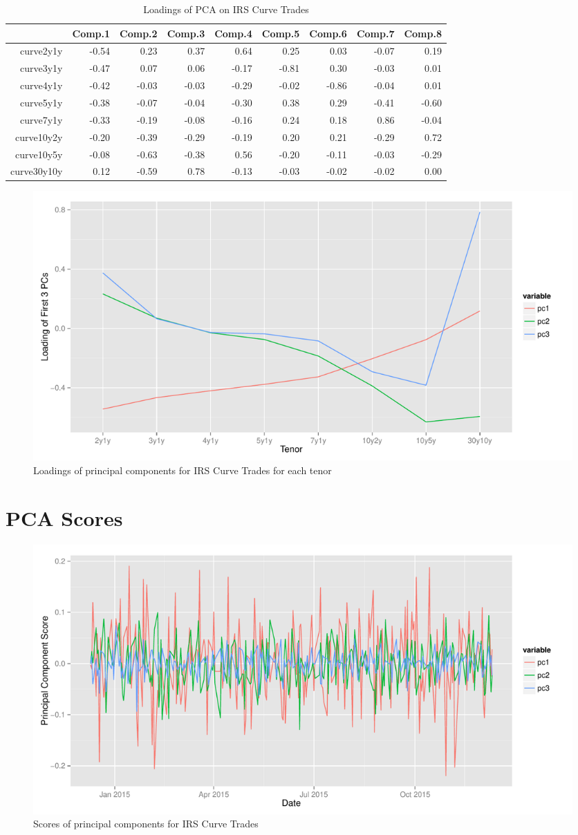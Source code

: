 \begin{table}[ht]
\centering
\begin{tabu}{rrrrrrrrr}
  \toprule
 & Comp.1 & Comp.2 & Comp.3 & Comp.4 & Comp.5 & Comp.6 & Comp.7 & Comp.8 \\ 
  \midrule
curve2y1y & -0.54 & 0.23 & 0.37 & 0.64 & 0.25 & 0.03 & -0.07 & 0.19 \\ 
  curve3y1y & -0.47 & 0.07 & 0.06 & -0.17 & -0.81 & 0.30 & -0.03 & 0.01 \\ 
  curve4y1y & -0.42 & -0.03 & -0.03 & -0.29 & -0.02 & -0.86 & -0.04 & 0.01 \\ 
  curve5y1y & -0.38 & -0.07 & -0.04 & -0.30 & 0.38 & 0.29 & -0.41 & -0.60 \\ 
  curve7y1y & -0.33 & -0.19 & -0.08 & -0.16 & 0.24 & 0.18 & 0.86 & -0.04 \\ 
  curve10y2y & -0.20 & -0.39 & -0.29 & -0.19 & 0.20 & 0.21 & -0.29 & 0.72 \\ 
  curve10y5y & -0.08 & -0.63 & -0.38 & 0.56 & -0.20 & -0.11 & -0.03 & -0.29 \\ 
  curve30y10y & 0.12 & -0.59 & 0.78 & -0.13 & -0.03 & -0.02 & -0.02 & 0.00 \\ 
   \bottomrule
\end{tabu}
\caption{Loadings of PCA on IRS Curve Trades}
\label{table:pca-loadings-curve}
\end{table}

\begin{figure}[H]
\centering\includegraphics[width=\textwidth]{pca-loadings-curve.pdf}
\caption{Loadings of principal components for IRS Curve Trades for each tenor}
\label{fig:pca-loadings-curve}
\end{figure}

\section{PCA Scores}

\begin{figure}[H]
\centering\includegraphics[width=\textwidth]{pca-scores-curve.pdf}
\caption{Scores of principal components for IRS Curve Trades}
\label{fig:pca-scores-curve}
\end{figure}